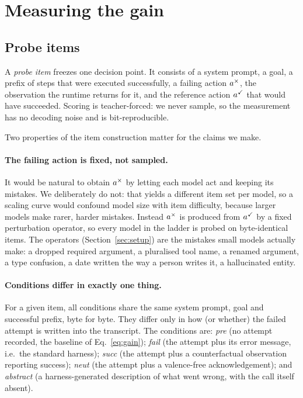 \section{Measuring the gain}
\label{sec:method}

\subsection{Probe items}

A \emph{probe item} freezes one decision point. It consists of a system prompt,
a goal, a prefix of steps that were executed successfully, a failing action
$a^{\times}$, the observation the runtime returns for it, and the reference action
$a^{\checkmark}$ that would have succeeded. Scoring is teacher-forced: we never sample,
so the measurement has no decoding noise and is bit-reproducible.

Two properties of the item construction matter for the claims we make.

\paragraph{The failing action is fixed, not sampled.}
It would be natural to obtain $a^{\times}$ by letting each model act and keeping its
mistakes. We deliberately do not: that yields a different item set per model, so
a scaling curve would confound model size with item difficulty, because larger models make
rarer, harder mistakes. Instead $a^{\times}$ is produced from $a^{\checkmark}$ by a
fixed perturbation operator, so every model in the ladder is probed on
byte-identical items. The operators (Section~\ref{sec:setup}) are the mistakes
small models actually make: a dropped required argument, a pluralised tool name,
a renamed argument, a type confusion, a date written the way a person writes it,
a hallucinated entity.

\paragraph{Conditions differ in exactly one thing.}
For a given item, all conditions share the same system prompt, goal and
successful prefix, byte for byte. They differ only in how (or whether) the
failed attempt is written into the transcript. The conditions are:
\emph{pre} (no attempt recorded, the baseline of Eq.~\ref{eq:gain});
\emph{fail} (the attempt plus its error message, i.e.\ the standard harness);
\emph{succ} (the attempt plus a counterfactual observation reporting success);
\emph{neut} (the attempt plus a valence-free acknowledgement); and
\emph{abstract} (a harness-generated description of what went wrong, with the
call itself absent).

